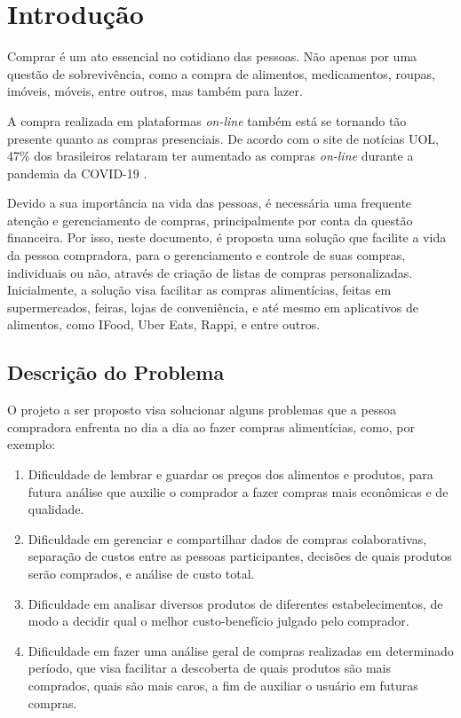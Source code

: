 \chapter{Introdução}
Comprar é um ato essencial no cotidiano das pessoas. Não apenas por
uma questão de sobrevivência, como a compra de alimentos,
medicamentos, roupas, imóveis, móveis, entre outros, mas também para
lazer.

A compra realizada em plataformas \textit{on-line} também está se
tornando tão presente quanto as compras presenciais. De acordo com o
site de notícias UOL, 47\% dos brasileiros relataram ter aumentado as
compras \textit{on-line} durante a pandemia da COVID-19
\cite{Uol2021}.

Devido a sua importância na vida das pessoas, é necessária uma
frequente atenção e gerenciamento de compras, principalmente por conta
da questão financeira. Por isso, neste documento, é proposta uma
solução que facilite a vida da pessoa compradora, para o gerenciamento
e controle de suas compras, individuais ou não, através de criação de
listas de compras personalizadas. Inicialmente, a solução visa
facilitar as compras alimentícias, feitas em supermercados, feiras,
lojas de conveniência, e até mesmo em aplicativos de alimentos, como
IFood, Uber Eats, Rappi, e entre outros.

\label{sec:descricao}
\section{Descrição do Problema}
O projeto a ser proposto visa solucionar alguns problemas que a pessoa
compradora enfrenta no dia a dia ao fazer compras alimentícias, como,
por exemplo:
\begin{enumerate}
\item Dificuldade de lembrar e guardar os preços dos alimentos e
  produtos, para futura análise que auxilie o comprador a fazer
  compras mais econômicas e de qualidade.
\item Dificuldade em gerenciar e compartilhar dados de compras
  colaborativas, separação de custos entre as pessoas participantes,
  decisões de quais produtos serão comprados, e análise de custo
  total.
\item Dificuldade em analisar diversos produtos de diferentes
  estabelecimentos, de modo a decidir qual o melhor custo-benefício
  julgado pelo comprador.
\item Dificuldade em fazer uma análise geral de compras realizadas em
  determinado período, que visa facilitar a descoberta de quais
  produtos são mais comprados, quais são mais caros, a fim de auxiliar
  o usuário em futuras compras.
\end{enumerate}

